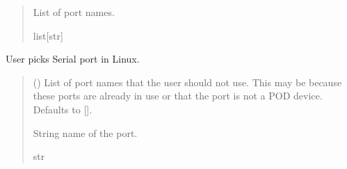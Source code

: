 \documentclass[letterpaper,10pt,english]{sphinxmanual}
\begin{document}
\begin{fulllineitems}
\begin{fulllineitems}
\begin{quote}
\begin{description}
\sphinxAtStartPar
List of port names.

\sphinxAtStartPar
list{[}str{]}

\end{description}\end{quote}

\end{fulllineitems}


\begin{fulllineitems}
\label{\detokenize{PodApi.Devices.SerialPorts:PodApi.Devices.SerialPorts.PortAccess.FindPorts._ChoosePortLinux}}
\pysigstartsignatures
{}
\pysigstopsignatures
\sphinxAtStartPar
User picks Serial port in Linux.
\begin{quote}\begin{description}
\sphinxAtStartPar
{} (\sphinxstyleliteralemphasis{\sphinxupquote{{[}}}\sphinxstyleliteralemphasis{\sphinxupquote{{]}}}\sphinxstyleliteralemphasis{\sphinxupquote{, }}) \textendash{} List of port names that the user should                 not use. This may be because these ports are already in use or that                 the port is not a POD device. Defaults to {[}{]}.

\sphinxAtStartPar
String name of the port.

\sphinxAtStartPar
str

\end{description}\end{quote}

\end{fulllineitems}



\end{fulllineitems}
\end{document}
